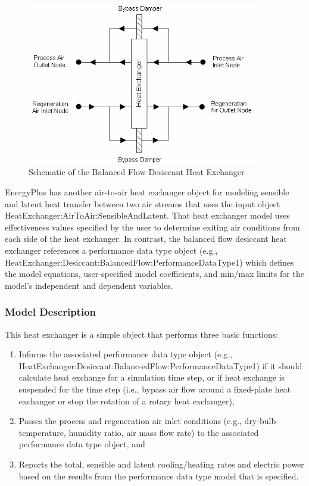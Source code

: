 \begin{figure}[hbtp] %
\centering
\includegraphics[width=0.9\textwidth, height=0.9\textheight, keepaspectratio=true]{media/image5554.png}
\caption{Schematic of the Balanced Flow Desiccant Heat Exchanger \protect \label{fig:schematic-of-the-balanced-flow-desiccant-heat}}
\end{figure}

EnergyPlus has another air-to-air heat exchanger object for modeling sensible and latent heat transfer between two air streams that uses the input object HeatExchanger:AirToAir:SensibleAndLatent. That heat exchanger model uses effectiveness values specified by the user to determine exiting air conditions from each side of the heat exchanger. In contrast, the balanced flow desiccant heat exchanger references a performance data type object (e.g., HeatExchanger:Desiccant:BalancedFlow:PerformanceDataType1) which defines the model equations, user-specified model coefficients, and min/max limits for the model's independent and dependent variables.

\subsubsection{Model Description}\label{model-description-2-006}

This heat exchanger is a simple object that performs three basic functions:

\begin{enumerate}
\item Informs the associated performance data type object (e.g., HeatExchanger:Desiccant:Balanc-edFlow:PerformanceDataType1) if it should calculate heat exchange for a simulation time step, or if heat exchange is suspended for the time step (i.e., bypass air flow around a fixed-plate heat exchanger or stop the rotation of a rotary heat exchanger),
\item Passes the process and regeneration air inlet conditions (e.g., dry-bulb temperature, humidity ratio, air mass flow rate) to the associated performance data type object, and
\item Reports the total, sensible and latent cooling/heating rates and electric power based on the results from the performance data type model that is specified.
\end{enumerate}


